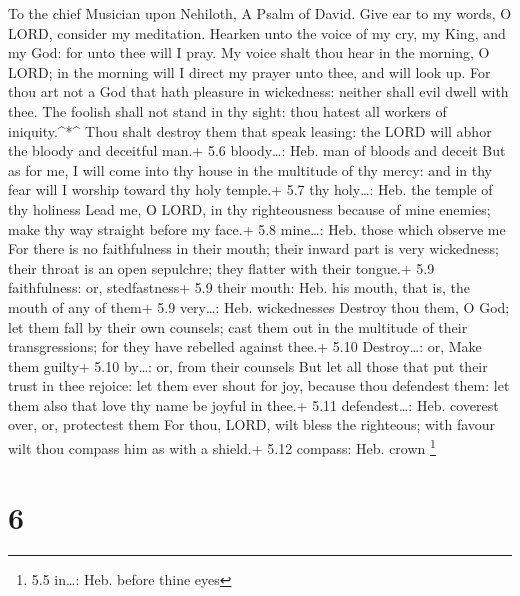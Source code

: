 To the chief Musician upon Nehiloth, A Psalm of David.  Give
ear to my words, O LORD, consider my meditation.  Hearken
unto the voice of my cry, my King, and my God: for unto thee will I
pray.  My voice shalt thou hear in the morning, O LORD; in
the morning will I direct my prayer unto thee, and will look up.
 For thou art not a God that hath pleasure in wickedness:
neither shall evil dwell with thee.  The foolish shall not
stand in thy sight: thou hatest all workers of iniquity.\^{}*\^{}
 Thou shalt destroy them that speak leasing: the LORD will
abhor the bloody and deceitful man.+ 5.6 bloody\ldots: Heb. man of
bloods and deceit  But as for me, I will come into thy house
in the multitude of thy mercy: and in thy fear will I worship toward thy
holy temple.+ 5.7 thy holy\ldots: Heb. the temple of thy holiness
 Lead me, O LORD, in thy righteousness because of mine
enemies; make thy way straight before my face.+ 5.8 mine\ldots: Heb.
those which observe me  For there is no faithfulness in
their mouth; their inward part is very wickedness; their throat is an
open sepulchre; they flatter with their tongue.+ 5.9 faithfulness: or,
stedfastness+ 5.9 their mouth: Heb. his mouth, that is, the mouth of any
of them+ 5.9 very\ldots: Heb. wickednesses  Destroy thou
them, O God; let them fall by their own counsels; cast them out in the
multitude of their transgressions; for they have rebelled against thee.+
5.10 Destroy\ldots: or, Make them guilty+ 5.10 by\ldots: or, from their
counsels  But let all those that put their trust in thee
rejoice: let them ever shout for joy, because thou defendest them: let
them also that love thy name be joyful in thee.+ 5.11 defendest\ldots:
Heb. coverest over, or, protectest them  For thou, LORD,
wilt bless the righteous; with favour wilt thou compass him as with a
shield.+ 5.12 compass: Heb. crown \footnote{5.5 in\ldots: Heb. before
  thine eyes}

\hypertarget{section-5}{%
\section{6}\label{section-5}}

